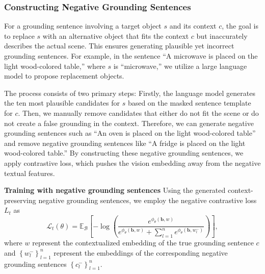 \documentclass[lettersize,journal]{IEEEtran}
\begin{document}
\subsubsection{Constructing Negative Grounding Sentences }
For a grounding sentence involving a target object \(s\) and its context \(c\), the goal is to replace \(s\) with an alternative object that fits the context \(c\) but inaccurately describes the actual scene. This ensures generating plausible yet incorrect grounding sentences.
For example, in the sentence ``A microwave is placed on the light wood-colored table,'' where \( s \) is ``microwave,'' we utilize a large language model to propose replacement objects.

The process consists of two primary steps:
Firstly, the language model generates the ten most plausible candidates for \( s \) based on the masked sentence template for \( c \).
Then, we manually remove candidates that either do not fit the scene or do not create a false grounding in the context. Therefore, we can generate negative grounding sentences such as ``An oven is placed on the light wood-colored table'' and remove negative grounding sentences like ``A fridge is placed on the light wood-colored table.'' By constructing these negative grounding sentences, we apply contrastive loss, which pushes the vision embedding away from the negative textual features. %


\textbf{Training with negative grounding sentences}
Using the generated context-preserving negative grounding sentences, we employ the negative contrastive loss $L_t$ as
\begin{equation}
\mathcal{L}_{t}(\theta)=\mathbb{E}_{\mathcal{B}}\left[-\log \left(\frac{e^{\phi_{\theta}(\mathbf{b}, w)}}{e^{\phi_{\theta}(\mathbf{b}, w)}+\sum_{l=1}^{n} e^{\phi_{\theta}\left(\mathbf{b}, w_{l}^{-}\right)}}\right)\right],
\label{ai:llang}
\end{equation}
where \( w \) represent the contextualized embedding of the true grounding sentence \( c\) and $\left \{ w_{l}^{-}   \right \} _{l=1}^{n}$ represent the embeddings of the corresponding negative grounding sentences $\left \{ c_{l}^{-}   \right \} _{l=1}^{n}$. 
\end{document}
